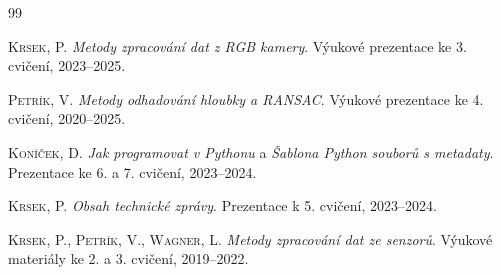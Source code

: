 \documentclass[a4paper,11pt]{article}
\begin{document}
\begingroup
\renewcommand{\section}[2]{} %
\begin{thebibliography}{99}

\textsc{Krsek, P.} \textit{Metody zpracování dat z RGB kamery}. Výukové prezentace ke 3. cvičení, 2023--2025.

\textsc{Petrík, V.} \textit{Metody odhadování hloubky a RANSAC}. Výukové prezentace ke 4. cvičení, 2020--2025.

\textsc{Koníček, D.} \textit{Jak programovat v Pythonu} a \textit{Šablona Python souborů s metadaty}. Prezentace ke 6. a 7. cvičení, 2023--2024.

\textsc{Krsek, P.} \textit{Obsah technické zprávy}. Prezentace k 5. cvičení, 2023--2024.

\textsc{Krsek, P., Petrík, V., Wagner, L.} \textit{Metody zpracování dat ze senzorů}. Výukové materiály ke 2. a 3. cvičení, 2019--2022.

\end{thebibliography}
\endgroup
\printbibliography

\appendix
\end{document}
